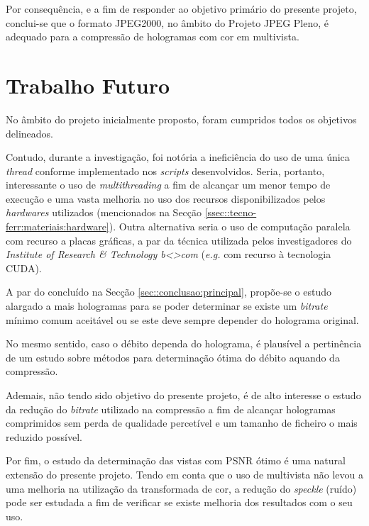 Por consequência, e a fim de responder ao objetivo primário do presente projeto, conclui-se que o formato JPEG2000, no âmbito do Projeto JPEG Pleno, é adequado para a compressão de hologramas com cor em multivista.


\section{Trabalho Futuro}
\label{sec::conclusao:futuro}

No âmbito do projeto inicialmente proposto, foram cumpridos todos os objetivos delineados.

Contudo, durante a investigação, foi notória a ineficiência do uso de uma única \textit{thread} conforme implementado nos \textit{scripts} desenvolvidos. Seria, portanto, interessante o uso de \textit{multithreading} a fim de alcançar um menor tempo de execução e uma vasta melhoria no uso dos recursos disponibilizados pelos \textit{hardwares} utilizados (mencionados na Secção \ref{ssec::tecno-ferr:materiais:hardware}). Outra alternativa seria o uso de computação paralela com recurso a placas gráficas, a par da técnica utilizada pelos investigadores do \textit{Institute of Research \& Technology b<>com} (\textit{e.g.} com recurso à tecnologia \ac{CUDA}\cite{Gilles2016}).

A par do concluído na Secção \ref{sec::conclusao:principal}, propõe-se o estudo alargado a mais hologramas para se poder determinar se existe um \textit{bitrate} mínimo comum  aceitável ou se este deve sempre depender do holograma original.

No mesmo sentido, caso o débito dependa do holograma, é plausível a pertinência de um estudo sobre métodos para determinação ótima do débito aquando da compressão.

Ademais, não tendo sido objetivo do presente projeto, é de alto interesse o estudo da redução do \textit{bitrate} utilizado na compressão a fim de alcançar hologramas comprimidos sem perda de qualidade percetível e um tamanho de ficheiro o mais reduzido possível.

Por fim, o estudo da determinação das vistas com \ac{PSNR} ótimo é uma natural extensão do presente projeto. Tendo em conta que o uso de multivista não levou a uma melhoria na utilização da transformada de cor, a redução do \textit{speckle} (ruído) pode ser estudada a fim de verificar se existe melhoria dos resultados com o seu uso.

